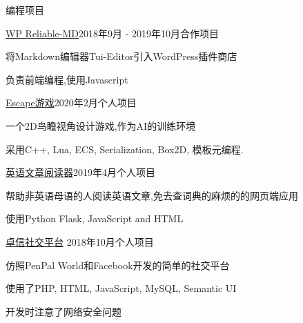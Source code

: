 \documentclass[UTF8]{resume} %
\begin{document}
\begin{rSection}{编程项目}
    
\begin{rSubsection}{\href{https://github.com/jackworkshop/WP-ReliableMD}{WP Reliable-MD}}{2018年9月 - 2019年10月}{合作项目}{}
    \item 将Markdown编辑器Tui-Editor引入WordPress插件商店
    \item 负责前端编程,使用Javascript
\end{rSubsection}

\begin{rSubsection}{\href{https://github.com/qiujiangkun/Escape}{Escape游戏}}{2020年2月}{个人项目}{}
    \item 一个2D鸟瞻视角设计游戏,作为AI的训练环境
    \item 采用C++, Lua, ECS, Serialization, Box2D, 模板元编程.
\end{rSubsection}
\begin{rSubsection}{\href{https://github.com/qiujiangkun/EnglishPassageReader}{英语文章阅读器}}{2019年4月}{个人项目}{}
    \item 帮助非英语母语的人阅读英语文章,免去查词典的麻烦的的网页端应用
    \item 使用Python Flask, JavaScript and HTML
\end{rSubsection}

\begin{rSubsection}{\href{https://github.com/qiujiangkun/ZhuoxinSocialWebsite}{卓信社交平台}} {2018年10月}{个人项目}{}

\item 仿照PenPal World和Facebook开发的简单的社交平台
\item 使用了PHP, HTML, JavaScript, MySQL, Semantic UI
\item 开发时注意了网络安全问题

\end{rSubsection}



\end{rSection}
\end{document}
